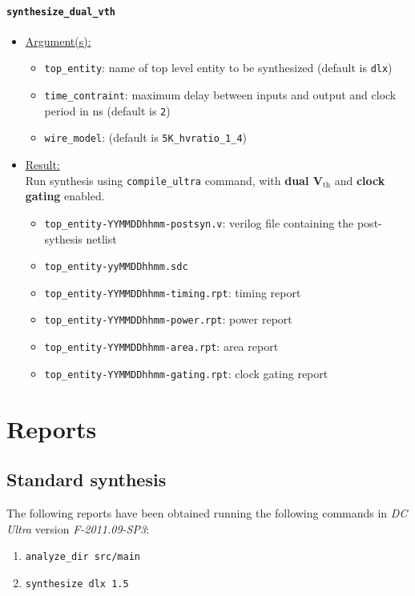 \paragraph{\texttt{synthesize\_dual\_vth}}
\begin{itemize}
	\item \underline{Argument(s):}
		\begin{itemize}
			\item \texttt{top\_entity}: name of top level entity to
				be synthesized (default is \texttt{dlx})
			\item \texttt{time\_contraint}: maximum delay between
				inputs and output and clock period in ns
				(default is \texttt{2})
			\item \texttt{wire\_model}: (default is \texttt{5K\_hvratio\_1\_4})
		\end{itemize}
	\item \underline{Result:} \\
		Run synthesis using \texttt{compile\_ultra} command, with
		\textbf{dual V$_{\text{th}}$} and \textbf{clock gating} enabled.
		\begin{itemize}
			\item \texttt{top\_entity-YYMMDDhhmm-postsyn.v}: verilog
				file containing the post-sythesis netlist
			\item \texttt{top\_entity-yyMMDDhhmm.sdc}
			\item \texttt{top\_entity-YYMMDDhhmm-timing.rpt}: timing
				report
			\item \texttt{top\_entity-YYMMDDhhmm-power.rpt}: power
				report
			\item \texttt{top\_entity-YYMMDDhhmm-area.rpt}: area
				report
			\item \texttt{top\_entity-YYMMDDhhmm-gating.rpt}: clock
				gating report
		\end{itemize}
\end{itemize}

\section{Reports}
\subsection{Standard synthesis}
\label{subsec:std_syn}
The following reports have been obtained running the following commands in
\textit{DC Ultra} version \textit{F-2011.09-SP3}:
\begin{enumerate}
	\item \texttt{analyze\_dir src/main}
	\item \texttt{synthesize dlx 1.5}
\end{enumerate}

